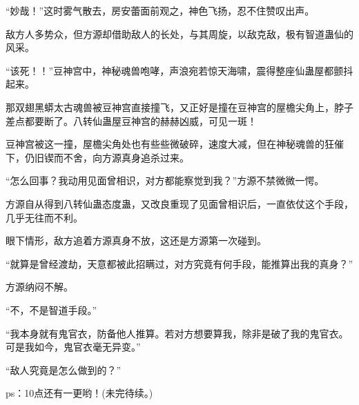\begin{this_body}
“妙哉！”这时雾气散去，房安蕾面前观之，神色飞扬，忍不住赞叹出声。

敌方人多势众，但方源却借助敌人的长处，与其周旋，以敌克敌，极有智道蛊仙的风采。

“该死！！”豆神宫中，神秘魂兽咆哮，声浪宛若惊天海啸，震得整座仙蛊屋都颤抖起来。

那双翅黑蟒太古魂兽被豆神宫直接撞飞，又正好是撞在豆神宫的屋檐尖角上，脖子差点都要断了。八转仙蛊屋豆神宫的赫赫凶威，可见一斑！

豆神宫被这一撞，屋檐尖角处也有些些微破碎，速度大减，但在神秘魂兽的狂催下，仍旧锲而不舍，向方源真身追杀过来。

“怎么回事？我动用见面曾相识，对方都能察觉到我？”方源不禁微微一愕。

方源自从得到八转仙蛊态度蛊，又改良重现了见面曾相识后，一直依仗这个手段，几乎无往而不利。

眼下情形，敌方追着方源真身不放，这还是方源第一次碰到。

“就算是曾经渡劫，天意都被此招瞒过，对方究竟有何手段，能推算出我的真身？”

方源纳闷不解。

“不，不是智道手段。”

“我本身就有鬼官衣，防备他人推算。若对方想要算我，除非是破了我的鬼官衣。可是我如今，鬼官衣毫无异变。”

“敌人究竟是怎么做到的？”

ps：10点还有一更哟！(未完待续。)

\end{this_body}

